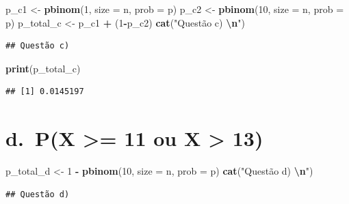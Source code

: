 \documentclass[
]{article}
\newenvironment{Shaded}{\begin{snugshade}}{\end{snugshade}}
\newcommand{\AttributeTok}[1]{\textcolor[rgb]{0.13,0.29,0.53}{#1}}
\newcommand{\DecValTok}[1]{\textcolor[rgb]{0.00,0.00,0.81}{#1}}
\newcommand{\FunctionTok}[1]{\textcolor[rgb]{0.13,0.29,0.53}{\textbf{#1}}}
\newcommand{\NormalTok}[1]{#1}
\newcommand{\OtherTok}[1]{\textcolor[rgb]{0.56,0.35,0.01}{#1}}
\newcommand{\SpecialCharTok}[1]{\textcolor[rgb]{0.81,0.36,0.00}{\textbf{#1}}}
\newcommand{\StringTok}[1]{\textcolor[rgb]{0.31,0.60,0.02}{#1}}
\begin{document}
\begin{Shaded}
\begin{Highlighting}[]
\NormalTok{p\_c1 }\OtherTok{\textless{}{-}} \FunctionTok{pbinom}\NormalTok{(}\DecValTok{1}\NormalTok{, }\AttributeTok{size =}\NormalTok{ n, }\AttributeTok{prob =}\NormalTok{ p)}
\NormalTok{p\_c2 }\OtherTok{\textless{}{-}} \FunctionTok{pbinom}\NormalTok{(}\DecValTok{10}\NormalTok{, }\AttributeTok{size =}\NormalTok{ n, }\AttributeTok{prob =}\NormalTok{ p)}
\NormalTok{p\_total\_c }\OtherTok{\textless{}{-}}\NormalTok{ p\_c1 }\SpecialCharTok{+}\NormalTok{ (}\DecValTok{1}\SpecialCharTok{{-}}\NormalTok{p\_c2)}
\FunctionTok{cat}\NormalTok{(}\StringTok{"Questão c) }\SpecialCharTok{\textbackslash{}n}\StringTok{"}\NormalTok{)}
\end{Highlighting}
\end{Shaded}

\begin{verbatim}
## Questão c)
\end{verbatim}

\begin{Shaded}
\begin{Highlighting}[]
\FunctionTok{print}\NormalTok{(p\_total\_c)}
\end{Highlighting}
\end{Shaded}

\begin{verbatim}
## [1] 0.0145197
\end{verbatim}

\section{d.~P(X \textgreater= 11 ou X \textgreater{}
13)}\label{d.-px-11-ou-x-13}

\begin{Shaded}
\begin{Highlighting}[]
\NormalTok{p\_total\_d }\OtherTok{\textless{}{-}} \DecValTok{1} \SpecialCharTok{{-}} \FunctionTok{pbinom}\NormalTok{(}\DecValTok{10}\NormalTok{, }\AttributeTok{size =}\NormalTok{ n, }\AttributeTok{prob =}\NormalTok{ p)}
\FunctionTok{cat}\NormalTok{(}\StringTok{"Questão d) }\SpecialCharTok{\textbackslash{}n}\StringTok{"}\NormalTok{)}
\end{Highlighting}
\end{Shaded}

\begin{verbatim}
## Questão d)
\end{verbatim}
\end{document}
